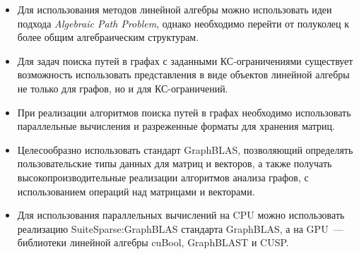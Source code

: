 \begin{itemize}
    \item Для использования методов линейной алгебры можно использовать идеи подхода \textit{Algebraic Path Problem}, однако необходимо перейти от полуколец к более общим алгебраическим структурам.
    \item Для задач поиска путей в графах с заданными КС-ограничениями существует возможность использовать представления в виде объектов линейной алгебры не только для графов, но и для КС-ограничений.
    \item При реализации алгоритмов поиска путей в графах необходимо использовать параллельные вычисления и разреженные форматы для хранения матриц.
	\item Целесообразно использовать стандарт GraphBLAS, позволяющий определять пользовательские типы данных для матриц и векторов, а также получать высокопроизводительные реализации алгоритмов анализа графов, с использованием операций над матрицами и векторами.
	\item Для использования параллельных вычислений на CPU можно использовать реализацию SuiteSparse:GraphBLAS стандарта GraphBLAS, а на GPU~--- библиотеки линейной алгебры cuBool, GraphBLAST и CUSP.
\end{itemize}


\FloatBarrier
